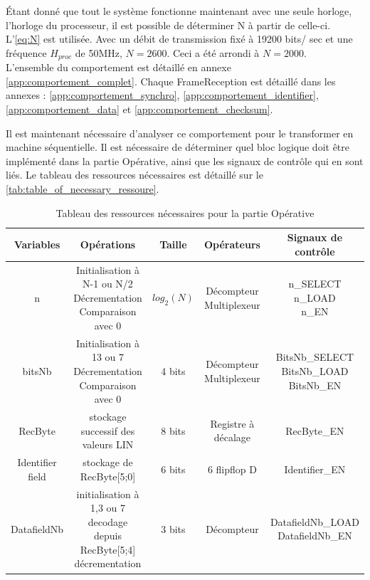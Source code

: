 Étant donné que tout le système fonctionne maintenant avec une seule horloge, l'horloge du processeur, il est possible de déterminer N à partir de celle-ci. L'\autoref{eq:N} est utilisée.
Avec un débit de transmission fixé à 19200 bits/ sec et une fréquence $H_{proc}$ de 50MHz, $N=2600$. Ceci a été arrondi à $N=2000$.\\

L'ensemble du comportement est détaillé en annexe \autoref{app:comportement_complet}. Chaque FrameReception est détaillé dans les annexes : \autoref{app:comportement_synchro}, \autoref{app:comportement_identifier}, \autoref{app:comportement_data} et \autoref{app:comportement_checksum}.

Il est maintenant nécessaire d'analyser ce comportement pour le transformer en machine séquentielle. Il est nécessaire de déterminer quel bloc logique doit être implémenté dans la partie Opérative, ainsi que les signaux de contrôle qui en sont liés.
Le tableau des ressources nécessaires est détaillé sur le \autoref{tab:table_of_necessary_ressoure}.

\begin{table}[H]
    \centering
    \begin{tabular}{c|c|c|c|c}
         Variables & Opérations & Taille & Opérateurs &  Signaux de contrôle \\
         \toprule
        n & \makecell{Initialisation à N-1 ou N/2\\Décrementation\\ Comparaison avec 0} & $log_2(N)$ & \makecell{Décompteur\\Multiplexeur} & \makecell{n\_SELECT\\n\_LOAD\\n\_EN}\\\midrule
        bitsNb & \makecell{Initialisation à 13 ou 7\\Décrementation\\ Comparaison avec 0} & 4 bits & \makecell{Décompteur\\Multiplexeur} & \makecell{BitsNb\_SELECT\\BitsNb\_LOAD\\BitsNb\_EN}\\\midrule
        RecByte & stockage successif des valeurs LIN & 8 bits & Registre à décalage & RecByte\_EN\\\midrule
        Identifier field & stockage de RecByte[5;0] & 6 bits & 6 flipflop D & Identifier\_EN\\\midrule
        DatafieldNb & \makecell{initialisation à 1,3 ou 7\\decodage depuis RecByte[5;4]\\décrementation} & 3 bits & Décompteur & \makecell{DatafieldNb\_LOAD\\DatafieldNb\_EN} \\
    \end{tabular}
    \caption{Tableau des ressources nécessaires pour la partie Opérative}
    \label{tab:table_of_necessary_ressoure}
\end{table}

